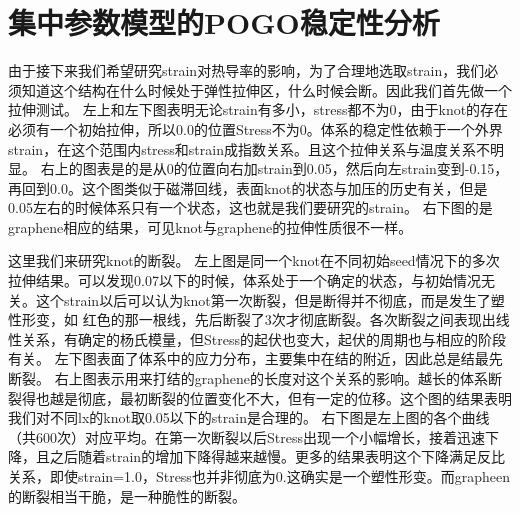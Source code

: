 
\chapter{集中参数模型的POGO稳定性分析}
由于接下来我们希望研究strain对热导率的影响，为了合理地选取strain，我们必须知道这个结构在什么时候处于弹性拉伸区，什么时候会断。因此我们首先做一个拉伸测试。
左上和左下图表明无论strain有多小，stress都不为0，由于knot的存在必须有一个初始拉伸，所以0.0的位置Stress不为0。体系的稳定性依赖于一个外界strain，在这个范围内stress和strain成指数关系。且这个拉伸关系与温度关系不明显。
右上的图表是的是从0的位置向右加strain到0.05，然后向左strain变到-0.15，再回到0.0。这个图类似于磁滞回线，表面knot的状态与加压的历史有关，但是0.05左右的时候体系只有一个状态，这也就是我们要研究的strain。
右下图的是graphene相应的结果，可见knot与graphene的拉伸性质很不一样。

这里我们来研究knot的断裂。
左上图是同一个knot在不同初始seed情况下的多次拉伸结果。可以发现0.07以下的时候，体系处于一个确定的状态，与初始情况无关。这个strain以后可以认为knot第一次断裂，但是断得并不彻底，而是发生了塑性形变，如
红色的那一根线，先后断裂了3次才彻底断裂。各次断裂之间表现出线性关系，有确定的杨氏模量，但Stress的起伏也变大，起伏的周期也与相应的阶段有关。
左下图表面了体系中的应力分布，主要集中在结的附近，因此总是结最先断裂。
右上图表示用来打结的graphene的长度对这个关系的影响。越长的体系断裂得也越是彻底，最初断裂的位置变化不大，但有一定的位移。这个图的结果表明我们对不同lx的knot取0.05以下的strain是合理的。
右下图是左上图的各个曲线（共600次）对应平均。在第一次断裂以后Stress出现一个小幅增长，接着迅速下降，且之后随着strain的增加下降得越来越慢。更多的结果表明这个下降满足反比关系，即使strain=1.0，Stress也并非彻底为0.这确实是一个塑性形变。而grapheen的断裂相当干脆，是一种脆性的断裂。


